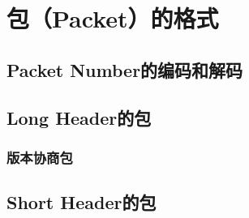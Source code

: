 \section{包（Packet）的格式}
\subsection{Packet Number的编码和解码}
\subsection{Long Header的包}
\subsubsection{版本协商包}
\label{subsubsec:version-negotiation-packet}
\subsection{Short Header的包}